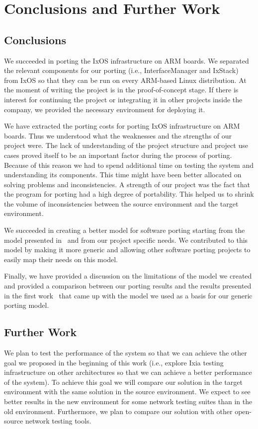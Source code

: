 \chapter{Conclusions and Further Work}

\section{Conclusions}
We succeeded in porting the IxOS infrastructure on ARM boards. We separated the
relevant components for our porting (i.e., InterfaceManager and IxStack) from
IxOS so that they can be run on every ARM-based Linux distribution. At the
moment of writing the project is in the proof-of-concept stage. If there is
interest for continuing the project or integrating it in other projects inside
the company, we provided the necessary environment for deploying it.

We have extracted the porting costs for porting IxOS infrastructure on ARM
boards. Thus we understood what the weaknesses and the strengths of our project
were. The lack of understanding of the project structure and project use cases
proved itself to be an important factor during the process of porting. Because
of this reason we had to spend additional time on testing the system and
understanding its components. This time might have been better allocated on
solving problems and inconsistencies. A strength of our project was the fact
that the program for porting had a high degree of portability. This helped us to
shrink the volume of inconsistencies between the source environment and the
target environment.

We succeeded in creating a better model for software porting starting from the
model presented in~\cite{hakuta,tanaka} and from our project specific needs. We
contributed to this model by making it more generic and allowing other software
porting projects to easily map their needs on this model.

Finally, we have provided a discussion on the limitations of the model we
created and provided a comparison between our porting results and the results
presented in the first work~\cite{hakuta} that came up with the model we used as a
basis for our generic porting model.

\section{Further Work}

We plan to test the performance of the system so that we can achieve the other
goal we proposed in the beginning of this work (i.e., explore Ixia testing
infrastructure on other architectures so that we can achieve a better
performance of the system). To achieve this goal we will compare our solution in
the target environment with the same solution in the source environment. We
expect to see better results in the new environment for some network testing
suites than in the old environment. Furthermore, we plan to compare our solution
with other open-source network testing tools.

